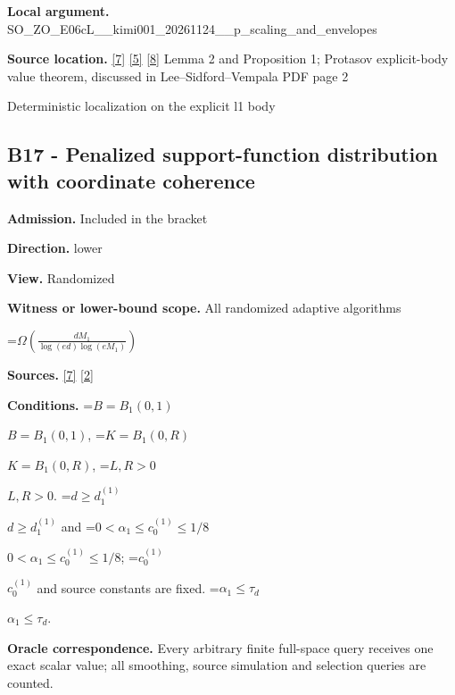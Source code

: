 \documentclass[10pt,a4paper]{article}
\newcommand{\AtlasMath}[1]{\par\begingroup\centering\setbox0=\hbox{$\displaystyle #1$}\ifdim\wd0>1.4\linewidth\typeout{ATLAS WIDE FORMULA: \the\wd0}\fi\ifdim\wd0>\linewidth\resizebox{\linewidth}{!}{\box0}\else\box0\fi\par\endgroup}
\newcommand{\AtlasInlineMath}[1]{\begingroup\setbox0=\hbox{$#1$}\ifdim\wd0>.4\linewidth\endgroup\AtlasMath{#1}\else\endgroup$#1$\fi}
\begin{document}
\textbf{Local argument.} SO\_ZO\_E06cL\_\_kimi001\_202\allowbreak{}61124\_\_p\_scaling\_and\_env\allowbreak{}elopes



\textbf{Source location.} \href{https://github.com/WU-Wendao/Colombo/blob/main/colombo_sensorium/Complexity_altas/data/sources/colombo/COLOMBO_KIMI_001/kimi_001.pdf}{[7]} \href{https://www.mathnet.ru/php/archive.phtml?jrnid=mzm&option_lang=eng&paperid=1697&wshow=paper}{[5]} \href{https://arxiv.org/pdf/1706.07357}{[8]} Lemma 2 and Proposition 1; Protasov explicit-body value theorem, discussed in Lee--Sidford--Vempala PDF page 2



Deterministic localization on the explicit l1 body



\subsection{B17 - Penalized support-function distribution with coordinate coherence}


\textbf{Admission.} Included in the bracket



\textbf{Direction.} lower



\textbf{View.} Randomized



\textbf{Witness or lower-bound scope.} All randomized adaptive algorithms



\AtlasMath{\Omega\!\left(\frac{dM_1}{\log(ed)\log(eM_1)}\right)}


\textbf{Sources.} \href{https://github.com/WU-Wendao/Colombo/blob/main/colombo_sensorium/Complexity_altas/data/sources/colombo/COLOMBO_KIMI_001/kimi_001.pdf}{[7]} \href{https://arxiv.org/html/2607.16558v2}{[2]}



\textbf{Conditions.} \AtlasInlineMath{B=B_1(0,1)}, \AtlasInlineMath{K=B_1(0,R)}, \AtlasInlineMath{L,R>0}. \AtlasInlineMath{d\ge d_1^{(1)}} and \AtlasInlineMath{0<\alpha_1\le c_0^{(1)}\le1/8}; \AtlasInlineMath{c_0^{(1)}} and source constants are fixed. \AtlasInlineMath{\alpha_1\le\tau_d}.



\textbf{Oracle correspondence.} Every arbitrary finite full-space query receives one exact scalar value; all smoothing, source simulation and selection queries are counted.
\end{document}
